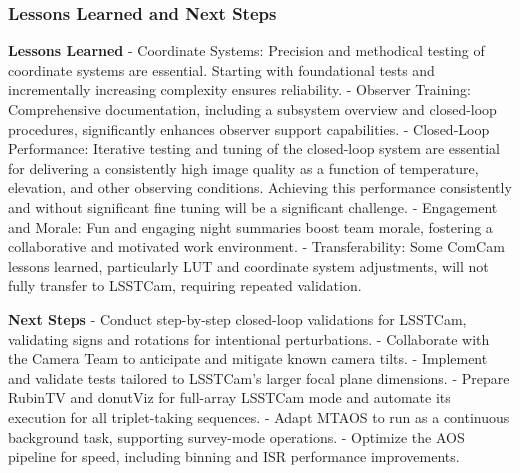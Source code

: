 \subsubsection{Lessons Learned and Next Steps}
\textbf{Lessons Learned}
- Coordinate Systems: Precision and methodical testing of coordinate systems are essential. 
Starting with foundational tests and incrementally increasing complexity ensures reliability.
- Observer Training: Comprehensive documentation, including a subsystem overview and closed-loop procedures, 
significantly enhances observer support capabilities.
- Closed-Loop Performance: Iterative testing and tuning of the closed-loop system are essential for delivering a consistently high image quality as a function of temperature, elevation, and other observing conditions. Achieving this performance consistently and without significant fine tuning will be a significant challenge.
- Engagement and Morale: Fun and engaging night summaries boost team morale, fostering a collaborative 
and motivated work environment.
- Transferability: Some ComCam lessons learned, particularly LUT and coordinate system adjustments, 
will not fully transfer to LSSTCam, requiring repeated validation.

\textbf{Next Steps}
- Conduct step-by-step closed-loop validations for LSSTCam, validating signs and rotations for intentional perturbations.
- Collaborate with the Camera Team to anticipate and mitigate known camera tilts.
- Implement and validate tests tailored to LSSTCam's larger focal plane dimensions.
- Prepare RubinTV and donutViz for full-array LSSTCam mode and automate its execution for all triplet-taking sequences.
- Adapt MTAOS to run as a continuous background task, supporting survey-mode operations.
- Optimize the AOS pipeline for speed, including binning and ISR performance improvements.


